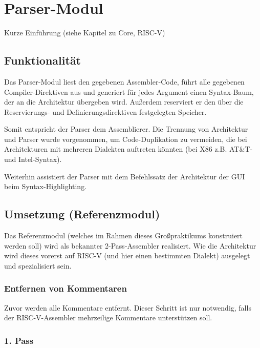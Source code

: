 \chapter{Parser-Modul}

{\color{red} Kurze Einführung (siehe Kapitel zu Core, RISC-V) }

\section{Funktionalität}

Das Parser-Modul liest den gegebenen Assembler-Code, führt alle gegebenen
Compiler-Direktiven aus und generiert für jedes Argument einen Syntax-Baum, der
an die Architektur übergeben wird.  Außerdem reserviert er den über die
Reservierungs- und Definierungsdirektiven festgelegten Speicher.

Somit entspricht der Parser dem Assemblierer.  Die Trennung von Architektur und
Parser wurde vorgenommen, um Code-Duplikation zu vermeiden, die bei
Architekturen mit mehreren Dialekten auftreten könnten (bei X86 z.B. AT\&T- und
Intel-Syntax).

Weiterhin assistiert der Parser mit dem Befehlssatz der Architektur der GUI beim
Syntax-Highlighting.

\section{Umsetzung (Referenzmodul)}

Das Referenzmodul (welches im Rahmen dieses Großpraktikums konstruiert werden
soll) wird als bekannter 2-Pass-Assembler realisiert. Wie die Architektur wird
dieses vorerst auf RISC-V (und hier einen bestimmten Dialekt) ausgelegt und
spezialisiert sein.

\subsection{Entfernen von Kommentaren}

Zuvor werden alle Kommentare entfernt. Dieser Schritt ist nur notwendig, falls
der RISC-V-Assembler mehrzeilige Kommentare unterstützen soll.

\subsection{1. Pass}

